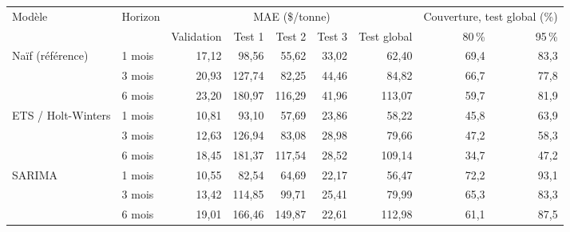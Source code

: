 \begin{tabular}{llrrrrrrr}
\toprule
Modèle & Horizon & \multicolumn{5}{c}{MAE (\$/tonne)} & \multicolumn{2}{c}{Couverture, test global (\%)} \\
\cmidrule(lr){3-7} \cmidrule(lr){8-9}
& & Validation & Test 1 & Test 2 & Test 3 & Test global & 80\,\% & 95\,\% \\
\midrule
Naïf (référence) & 1 mois & 17,12 & 98,56 & 55,62 & 33,02 & 62,40 & 69,4 & 83,3 \\
 & 3 mois & 20,93 & 127,74 & 82,25 & 44,46 & 84,82 & 66,7 & 77,8 \\
 & 6 mois & 23,20 & 180,97 & 116,29 & 41,96 & 113,07 & 59,7 & 81,9 \\
\midrule
ETS / Holt-Winters & 1 mois & 10,81 & 93,10 & 57,69 & 23,86 & 58,22 & 45,8 & 63,9 \\
 & 3 mois & 12,63 & 126,94 & 83,08 & 28,98 & 79,66 & 47,2 & 58,3 \\
 & 6 mois & 18,45 & 181,37 & 117,54 & 28,52 & 109,14 & 34,7 & 47,2 \\
\midrule
SARIMA & 1 mois & 10,55 & 82,54 & 64,69 & 22,17 & 56,47 & 72,2 & 93,1 \\
 & 3 mois & 13,42 & 114,85 & 99,71 & 25,41 & 79,99 & 65,3 & 83,3 \\
 & 6 mois & 19,01 & 166,46 & 149,87 & 22,61 & 112,98 & 61,1 & 87,5 \\
\bottomrule
\end{tabular}
